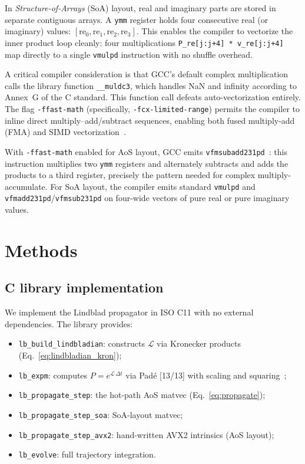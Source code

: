 \documentclass[final,3p,times,twocolumn]{elsarticle}
\begin{document}
In \emph{Structure-of-Arrays} (SoA) layout, real and imaginary parts are
stored in separate contiguous arrays. A \texttt{ymm} register holds four
consecutive real (or imaginary) values:
$[\mathrm{re}_0, \mathrm{re}_1, \mathrm{re}_2, \mathrm{re}_3]$. This
enables the compiler to vectorize the inner product loop cleanly: four
multiplications \texttt{P\_re[j:j+4] * v\_re[j:j+4]} map directly to a
single \texttt{vmulpd} instruction with no shuffle overhead.

A critical compiler consideration is that GCC's default complex
multiplication calls the library function \texttt{\_\_muldc3}, which handles
NaN and infinity according to Annex~G of the C standard. This function call
defeats auto-vectorization entirely. The flag \texttt{-ffast-math}
(specifically, \texttt{-fcx-limited-range}) permits the compiler to inline
direct multiply--add/subtract sequences, enabling both fused multiply-add
(FMA) and SIMD vectorization~\cite{AgnerFog}.

With \texttt{-ffast-math} enabled for AoS layout, GCC emits
\texttt{vfmsubadd231pd}~\cite{IntelIntrinsics}: this instruction multiplies
two \texttt{ymm} registers and alternately subtracts and adds the products
to a third register, precisely the pattern needed for complex
multiply-accumulate. For SoA layout, the compiler emits standard
\texttt{vmulpd} and \texttt{vfmadd231pd}/\texttt{vfmsub231pd} on four-wide
vectors of pure real or pure imaginary values.

\section{Methods}
\label{sec:methods}

\subsection{C library implementation}
\label{sec:impl}

We implement the Lindblad propagator in ISO C11 with no external
dependencies. The library provides:
\begin{itemize}
  \item \texttt{lb\_build\_lindbladian}: constructs $\mathcal{L}$ via
        Kronecker products (Eq.~\eqref{eq:lindbladian_kron});
  \item \texttt{lb\_expm}: computes $P = e^{\mathcal{L}\,\Delta t}$ via
        Pad\'{e} [13/13] with scaling and squaring~\cite{Higham2005};
  \item \texttt{lb\_propagate\_step}: the hot-path AoS matvec
        (Eq.~\eqref{eq:propagate});
  \item \texttt{lb\_propagate\_step\_soa}: SoA-layout matvec;
  \item \texttt{lb\_propagate\_step\_avx2}: hand-written AVX2 intrinsics
        (AoS layout);
  \item \texttt{lb\_evolve}: full trajectory integration.
\end{itemize}
\end{document}
